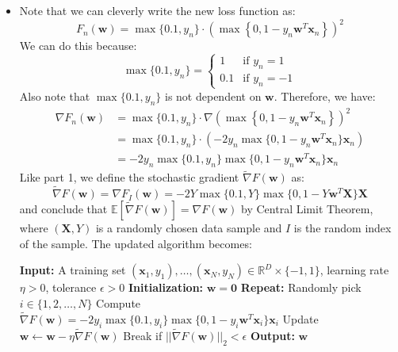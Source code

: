 \documentclass{article}
\newcommand{\mathbi}[1]{\boldsymbol{#1}}
\newcommand{\IndentState}{\State \hspace{2em}}
\begin{document}
\begin{itemize}
\begin{itemize}
      \item[(c)] Note that we can cleverly write the new loss function as:
      \[
        F_n(\mathbi{w}) = \max\{0.1, y_n\} \cdot \left( \max \left\{0, 1 - y_n \mathbi{w}^T \mathbi{x}_n \right\} \right)^2
      \]
      We can do this because:
      \[
        \max\{0.1, y_n\} =
        \begin{cases}
           1 & \text{if } y_n = 1 \\
           0.1 & \text{if } y_n = -1
        \end{cases}
      \]
      Also note that $\max\{0.1, y_n\}$ is not dependent on $\mathbi{w}$.
      Therefore, we have:
      \begin{align*}
        \nabla F_n(\mathbi{w}) &= \max\{0.1, y_n\} \cdot \nabla \left( \max \left\{0, 1 - y_n \mathbi{w}^T \mathbi{x}_n \right\} \right)^2 \\
        &= \max\{0.1, y_n\} \cdot (-2 y_n \max\{0, 1 - y_n \mathbi{w}^T \mathbi{x}_n\} \mathbi{x}_n) \tag{From part 1} \\
        &= -2 y_n \max\{0.1, y_n\} \max\{0, 1 - y_n \mathbi{w}^T \mathbi{x}_n\} \mathbi{x}_n
      \end{align*}
      Like part 1, we define the stochastic gradient $\tilde{\nabla} F(\mathbi{w})$ as:
      \[
        \tilde{\nabla} F(\mathbi{w}) = \nabla F_I(\mathbi{w}) = -2 Y \max\{0.1, Y\} \max\{0, 1 - Y \mathbi{w}^T \mathbi{X}\} \mathbi{X}
      \]
      and conclude that $\mathbb{E}[\tilde{\nabla} F(\mathbi{w})] = \nabla F(\mathbi{w})$ by Central Limit Theorem, where $(\mathbi{X}, Y)$ is a randomly chosen data sample and $I$ is the random index of the sample.
      The updated algorithm becomes:
      \begin{algorithm}
        \caption{SGD for minimizing modified $F(\mathbi{w})$}
        \begin{algorithmic}[1]
          \State \textbf{Input:} A training set $(\mathbi{x}_1, y_1), \dots, (\mathbi{x}_N, y_N) \in \mathbb{R}^D \times \{-1, 1\}$, learning rate $\eta > 0$, tolerance $\epsilon > 0$
          \State \textbf{Initialization:} $\mathbi{w} = \mathbi{0}$
          \State \textbf{Repeat:}
            \IndentState Randomly pick $i \in \{1, 2, \dots, N\}$
            \IndentState Compute $\tilde{\nabla} F(\mathbi{w}) = -2 y_i \max\{0.1, y_i\} \max\{0, 1 - y_i \mathbi{w}^T \mathbi{x}_i\} \mathbi{x}_i$
            \IndentState Update $\mathbi{w} \gets \mathbi{w} - \eta \tilde{\nabla} F(\mathbi{w})$
            \IndentState Break if $||\tilde{\nabla} F(\mathbi{w})||_2 < \epsilon$
          \State \textbf{Output:} $\mathbi{w}$
        \end{algorithmic}
      \end{algorithm}
    \end{itemize}
  \end{itemize}
\end{document}
